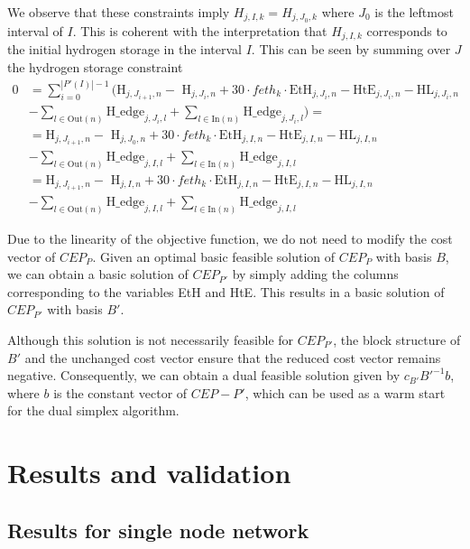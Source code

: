 \documentclass[english]{article}
\numberwithin{definition}{section}
\numberwithin{theorem}{section}
\numberwithin{problem}{section}
\begin{document}
We observe that these constraints imply \(H_{j,I,k} = H_{j,J_0,k}\) where \(J_0\) is the leftmost interval of \(I\). This is coherent with the interpretation that \(H_{j,I,k}\) corresponds to the initial hydrogen storage in the interval \(I\). This can be seen by summing over \(J\) the hydrogen storage constraint %
\begin{align*}
 0 & = \sum_{i=0}^{|P'(I)|-1}\bigl(\text{H}_{j,J_{i+1},n}  - \text{ H}_{j,J_{i},n} + 30 \cdot feth_k \cdot \text{EtH}_{j,J_{i},n} - \text{HtE}_{j,J_{i},n} - \text{HL}_{j,J_{i},n} \\
&- \sum_{l \in \text{Out}(n)} \text{H\_edge}_{j,J_{i},l}  + \sum_{l \in \text{In}(n)} \text{H\_edge}_{j,J_{i},l} \bigr) =  \\  
&=   \text{H}_{j,J_{i+1},n}  - \text{ H}_{j,J_{0},n} + 30 \cdot feth_k \cdot \text{EtH}_{j,I,n} - \text{HtE}_{j,I,n} - \text{HL}_{j,I,n}  \\ 
&-\sum_{l \in \text{Out}(n)} \text{H\_edge}_{j,I,l}  + \sum_{l \in \text{In}(n)} \text{H\_edge}_{j,I,l} \\ 
&= \text{H}_{j,J_{i+1},n}  - \text{ H}_{j,I, n} + 30 \cdot feth_k \cdot \text{EtH}_{j,I,n} - \text{HtE}_{j,I,n} - \text{HL}_{j,I,n} \\
&- \sum_{l \in \text{Out}(n)} \text{H\_edge}_{j,I,l}  + \sum_{l \in \text{In}(n)} \text{H\_edge}_{j,I,l}
\end{align*}

Due to the linearity of the objective function, we do not need to modify the cost vector of \(CEP_P\). Given an optimal basic feasible solution of \(CEP_P\) with basis \(B\), we can obtain a basic solution of \(CEP_{P'}\) by simply adding the columns corresponding to the variables EtH and HtE. This results in a basic solution of \(CEP_{P'}\) with basis \(B'\).

Although this solution is not necessarily feasible for \(CEP_{P'}\), the block structure of \(B'\) and the unchanged cost vector ensure that the reduced cost vector remains negative. Consequently, we can obtain a dual feasible solution given by \(c_{B'} B'^{-1} b\), where \(b\) is the constant vector of \(CEP-P'\), which can be used as a warm start for the dual simplex algorithm.


\section{Results and validation}
\subsection{Results for single node network}
\end{document}
